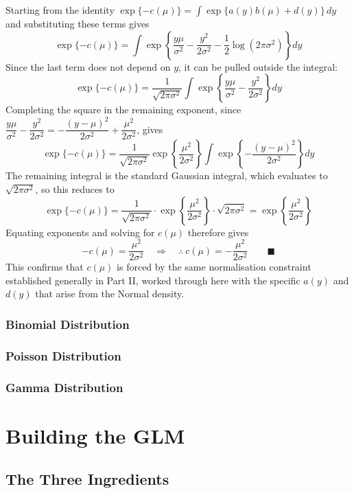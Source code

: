 \documentclass[12pt,a4paper]{report}
\begin{document}
Starting from the identity $\exp\{-c(\mu)\} = \int \exp\{a(y)b(\mu) + d(y)\}\,dy$ and substituting these terms gives
\[
\exp\{-c(\mu)\} = \int \exp\left\{\frac{y\mu}{\sigma^2} - \frac{y^2}{2\sigma^2} - \frac{1}{2}\log(2\pi\sigma^2)\right\} dy
\]
Since the last term does not depend on $y$, it can be pulled outside the integral:
\[
\exp\{-c(\mu)\} = \frac{1}{\sqrt{2\pi\sigma^2}} \int \exp\left\{\frac{y\mu}{\sigma^2} - \frac{y^2}{2\sigma^2}\right\} dy
\]
Completing the square in the remaining exponent, since $\dfrac{y\mu}{\sigma^2} - \dfrac{y^2}{2\sigma^2} = -\dfrac{(y-\mu)^2}{2\sigma^2} + \dfrac{\mu^2}{2\sigma^2}$, gives
\[
\exp\{-c(\mu)\} = \frac{1}{\sqrt{2\pi\sigma^2}} \exp\left\{\frac{\mu^2}{2\sigma^2}\right\} \int \exp\left\{-\frac{(y-\mu)^2}{2\sigma^2}\right\} dy
\]
The remaining integral is the standard Gaussian integral, which evaluates to $\sqrt{2\pi\sigma^2}$, so this reduces to
\[
\exp\{-c(\mu)\} = \frac{1}{\sqrt{2\pi\sigma^2}} \cdot \exp\left\{\frac{\mu^2}{2\sigma^2}\right\} \cdot \sqrt{2\pi\sigma^2} = \exp\left\{\frac{\mu^2}{2\sigma^2}\right\}
\]
Equating exponents and solving for $c(\mu)$ therefore gives
\[
-c(\mu) = \frac{\mu^2}{2\sigma^2} \quad\Longrightarrow\quad \therefore\ c(\mu) = -\frac{\mu^2}{2\sigma^2} \qquad \blacksquare
\]
This confirms that $c(\mu)$ is forced by the same normalisation constraint established generally in Part II, worked through here with the specific $a(y)$ and $d(y)$ that arise from the Normal density.

\section{Binomial Distribution}

\section{Poisson Distribution}

\section{Gamma Distribution}

\part{Building the GLM}

\chapter{The Three Ingredients}
\end{document}
